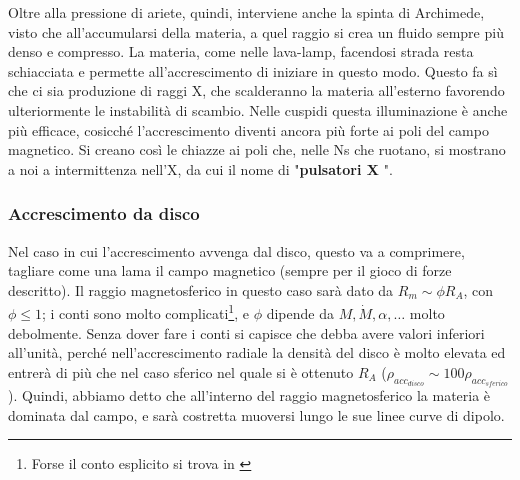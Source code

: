 Oltre alla pressione di ariete, quindi, interviene anche la spinta di Archimede, visto che all'accumularsi della materia, a quel raggio si crea un fluido sempre più denso e compresso.
La materia, come nelle lava-lamp, facendosi strada resta schiacciata e permette all'accrescimento di iniziare in questo modo.
Questo fa sì che ci sia produzione di raggi X, che scalderanno la materia all'esterno favorendo ulteriormente le instabilità di scambio.
Nelle cuspidi questa illuminazione è anche più efficace, cosicché l'accrescimento diventi ancora più forte ai poli del campo magnetico.
Si creano così le chiazze ai poli che, nelle Ns che ruotano, si mostrano a noi a intermittenza nell'X, da cui il nome di "\textbf{pulsatori X}
".
\subsubsection{Accrescimento da disco}
Nel caso in cui l'accrescimento avvenga dal disco, questo va a comprimere, tagliare come una lama il campo magnetico (sempre per il gioco di forze descritto).
Il raggio magnetosferico in questo caso sarà dato da $R_m\sim\phi R_A$, con $\phi\leq1$; i conti sono molto complicati\footnote{Forse il conto esplicito si trova in \cite{Hayakawa}}, e $\phi$ dipende da $M, \dot{M},\alpha,\dots$ molto debolmente.
Senza dover fare i conti si capisce che debba avere valori inferiori all'unità, perché nell'accrescimento radiale la densità del disco è molto elevata ed entrerà di più che nel caso sferico nel quale si è ottenuto $R_A$ ($\rho_{acc_{disco}}\sim100\rho_{acc_{sferico}} $).
Quindi, abbiamo detto che all'interno del raggio magnetosferico la materia è dominata dal campo, e sarà costretta  muoversi lungo le sue linee curve di dipolo. 

